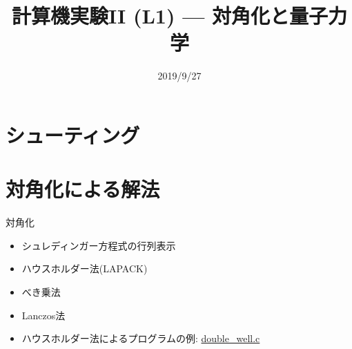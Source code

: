 \documentclass[dvipdfmx]{beamer}
\title{計算機実験II (L1) --- 対角化と量子力学}
\date{2019/9/27}
\begin{document}
\begin{frame}
  \titlepage
  \tableofcontents
\end{frame}





\section{シューティング}











\section{対角化による解法}

\begin{frame}[t,fragile]{対角化}
  \begin{itemize}
    \setlength{\itemsep}{1em}
  \item シュレディンガー方程式の行列表示
  \item ハウスホルダー法(LAPACK)
  \item べき乗法
  \item Lanczos法
  \item ハウスホルダー法によるプログラムの例: \href{https://github.com/todo-group/computer-experiments/blob/master/exercise/eigenvalue_problem/double_well.c}{double\_well.c}
  \end{itemize}
\end{frame}





%

%











\end{document}
